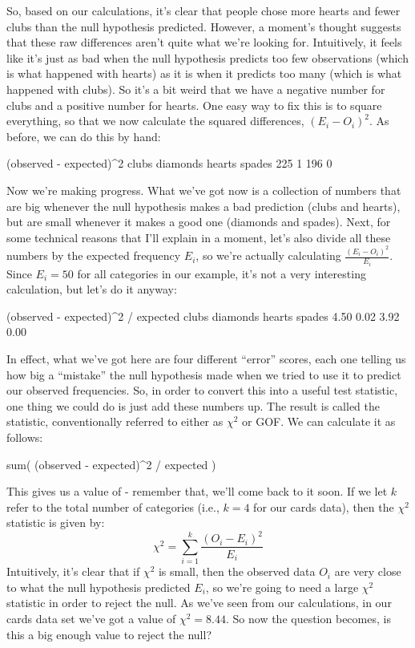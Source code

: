 So, based on our calculations, it's clear that people chose more hearts and fewer clubs than the null hypothesis predicted. However, a moment's thought suggests that these raw differences aren't quite what we're looking for. Intuitively, it feels like it's just as bad when the null hypothesis predicts too few observations (which is what happened with hearts) as it is when it predicts too many (which is what happened with clubs). So it's a bit weird that we have a negative number for clubs and a positive number for hearts. One easy way to fix this is to square everything, so that we now calculate the squared differences, $(E_i - O_i)^2$. As before, we can do this by hand: 

\begin{rblock1}
(observed - expected)^2
   clubs diamonds   hearts   spades 
     225        1      196        0 
\end{rblock1}

Now we're making progress. What we've got now is a collection of numbers that are big whenever the null hypothesis makes a bad prediction (clubs and hearts), but are small whenever it makes a good one (diamonds and spades). Next, for some technical reasons that I'll explain in a moment, let's also divide all these numbers by the expected frequency $E_i$, so we're actually calculating $\frac{(E_i-O_i)^2}{E_i}$. Since $E_i = 50$ for all categories in our example, it's not a very interesting calculation, but let's do it anyway: 
\begin{rblock1}
(observed - expected)^2 / expected
   clubs diamonds   hearts   spades 
    4.50     0.02     3.92     0.00 
\end{rblock1}

In effect, what we've got here are four different ``error'' scores, each one telling us how big a ``mistake'' the null hypothesis made when we tried to use it to predict our observed frequencies. So, in order to convert this into a useful test statistic, one thing we could do is just add these numbers up. The result is called the  statistic, conventionally referred to either as $\chi^2$ or GOF. We can calculate it as follows: 

\begin{rblock1}
sum( (observed - expected)^2 / expected )
\end{rblock1}

This gives us a value of  - remember that, we'll come back to it soon. If we let $k$ refer to the total number of categories (i.e., $k=4$ for our cards data), then the $\chi^2$ statistic is given by:
$$
\chi^2 = \sum_{i=1}^k \frac{(O_i - E_i)^2}{E_i}
$$ 
Intuitively, it's clear that if $\chi^2$ is small, then the observed data $O_i$ are very close to what the null hypothesis predicted $E_i$, so we're going to need a large $\chi^2$ statistic in order to reject the null. As we've seen from our calculations, in our cards data set we've got a value of $\chi^2 = 8.44$. So now the question becomes, is this a big enough value to reject the null?

